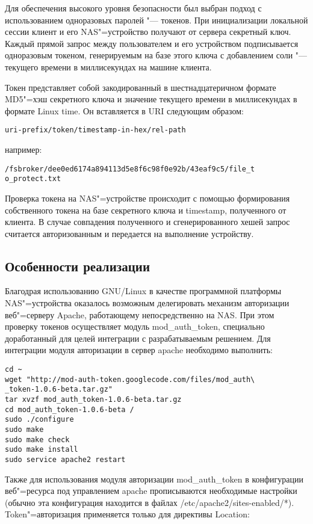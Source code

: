 \documentclass[10pt, a5paper]{article}
\begin{document}
Для обеспечения высокого уровня безопасности был выбран подход с использованием одноразовых паролей "--- токенов. При инициализации локальной сессии клиент и его NAS"=устройство получают от сервера секретный ключ. Каждый прямой запрос между пользователем и его устройством подписывается одноразовым токеном, генерируемым на базе этого ключа с добавлением соли "--- текущего времени в миллисекундах на машине клиента.

Токен представляет собой закодированный в шестнадцатеричном формате MD5"=хэш секретного ключа и значение текущего времени в миллисекундах в формате Linux time. Он вставляется в URI следующим образом:

\begin{verbatim}
uri-prefix/token/timestamp-in-hex/rel-path\end{verbatim}
например:

\begin{verbatim}
/fsbroker/dee0ed6174a894113d5e8f6c98f0e92b/43eaf9c5/file_t
o_protect.txt\end{verbatim}
Проверка токена на NAS"=устройстве происходит с помощью формирования собственного токена на базе секретного ключа и timestamp, полученного от клиента. В случае совпадения полученного и сгенерированного хешей запрос считается авторизованным и передается на выполнение устройству.

\subsection*{Особенности реализации}

Благодрая использованию GNU/Linux в качестве программной платформы NAS"=устройства оказалось возможным делегировать механизм авторизации веб"=серверу Apache, работающему непосредственно на NAS. При этом проверку токенов осуществляет модуль mod\_auth\_token, специально доработанный для целей интеграции с разрабатываемым решением. 
Для интеграции модуля авторизации в сервер apache необходимо выполнить:

\begin{verbatim}
cd ~ 
wget "http://mod-auth-token.googlecode.com/files/mod_auth\
_token-1.0.6-beta.tar.gz" 
tar xvzf mod_auth_token-1.0.6-beta.tar.gz 
cd mod_auth_token-1.0.6-beta / 
sudo ./configure 
sudo make 
sudo make check 
sudo make install 
sudo service apache2 restart \end{verbatim}
Также для использования модуля авторизации mod\_auth\_token в конфигурации веб"=ресурса под управлением apache прописываются необходимые настройки (обычно эта конфигурация находится в файлах /etc/apache2/sites-enabled/*). Token"=авторизация применяется только для директивы Location:
\end{document}
